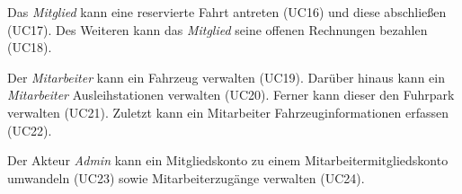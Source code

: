 Das \emph{Mitglied} kann eine reservierte Fahrt antreten (UC16) und diese abschließen (UC17).
Des Weiteren kann das \emph{Mitglied} seine offenen Rechnungen bezahlen (UC18). \medskip

Der \emph{Mitarbeiter} kann ein Fahrzeug verwalten (UC19).
Darüber hinaus kann ein \emph{Mitarbeiter} Ausleihstationen verwalten (UC20).
Ferner kann dieser den Fuhrpark verwalten (UC21).
Zuletzt kann ein Mitarbeiter Fahrzeuginformationen erfassen (UC22). \medskip

Der Akteur \emph{Admin} kann ein Mitgliedskonto zu einem Mitarbeitermitgliedskonto umwandeln (UC23)
sowie Mitarbeiterzugänge verwalten (UC24).